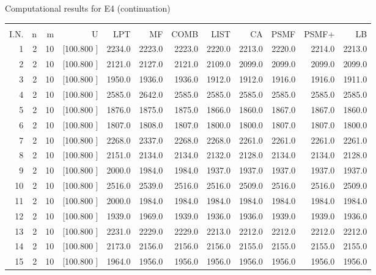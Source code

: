 \documentclass[12pt,a4paper]{article}
\begin{document}
\newpage
\begin{center}
 Computational results for E4 (continuation) {\tiny
\begin{tabular}{r r r r r r r r r r r r}\hline
    &   &   &          &        &        &        &        &        &        &        &       \\[-0.1in]
  I.N.  &  n  &  m  &  U  &  LPT  &  MF  &  COMB  &  LIST  &  CA  & PSMF &PSMF+ & LB \\[0.03in]
\hline
   1&  2& 10&[100.800   ]&  2234.0&  2223.0&  2223.0&  2220.0&  2213.0&  2220.0&  2214.0&  2213.0\\[-0.02in]
   2&  2& 10&[100.800   ]&  2121.0&  2127.0&  2121.0&  2109.0&  2099.0&  2099.0&  2099.0&  2099.0\\[-0.02in]
   3&  2& 10&[100.800   ]&  1950.0&  1936.0&  1936.0&  1912.0&  1912.0&  1916.0&  1916.0&  1911.0\\[-0.02in]
   4&  2& 10&[100.800   ]&  2585.0&  2642.0&  2585.0&  2585.0&  2585.0&  2585.0&  2585.0&  2585.0\\[-0.02in]
   5&  2& 10&[100.800   ]&  1876.0&  1875.0&  1875.0&  1866.0&  1860.0&  1867.0&  1867.0&  1860.0\\[-0.02in]
   6&  2& 10&[100.800   ]&  1807.0&  1808.0&  1807.0&  1800.0&  1800.0&  1807.0&  1807.0&  1800.0\\[-0.02in]
   7&  2& 10&[100.800   ]&  2268.0&  2337.0&  2268.0&  2268.0&  2261.0&  2261.0&  2261.0&  2261.0\\[-0.02in]
   8&  2& 10&[100.800   ]&  2151.0&  2134.0&  2134.0&  2132.0&  2128.0&  2134.0&  2134.0&  2128.0\\[-0.02in]
   9&  2& 10&[100.800   ]&  2000.0&  1984.0&  1984.0&  1937.0&  1937.0&  1937.0&  1937.0&  1937.0\\[-0.02in]
  10&  2& 10&[100.800   ]&  2516.0&  2539.0&  2516.0&  2516.0&  2509.0&  2516.0&  2516.0&  2509.0\\[-0.02in]
  11&  2& 10&[100.800   ]&  2000.0&  1984.0&  1984.0&  1984.0&  1984.0&  1984.0&  1984.0&  1984.0\\[-0.02in]
  12&  2& 10&[100.800   ]&  1939.0&  1969.0&  1939.0&  1936.0&  1936.0&  1939.0&  1939.0&  1936.0\\[-0.02in]
  13&  2& 10&[100.800   ]&  2231.0&  2229.0&  2229.0&  2213.0&  2212.0&  2212.0&  2212.0&  2212.0\\[-0.02in]
  14&  2& 10&[100.800   ]&  2173.0&  2156.0&  2156.0&  2156.0&  2155.0&  2155.0&  2155.0&  2155.0\\[-0.02in]
  15&  2& 10&[100.800   ]&  1964.0&  1956.0&  1956.0&  1956.0&  1956.0&  1956.0&  1956.0&  1956.0\\[-0.02in]

\end{tabular}}
\end{center}
\end{document}
